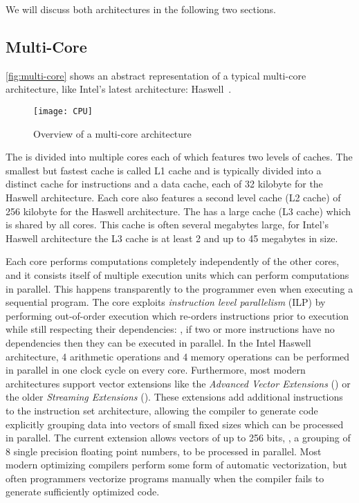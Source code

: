 We will discuss both architectures in the following two sections.

\subsection{Multi-Core \CPUs}
\autoref{fig:multi-core} shows an abstract representation of a typical multi-core \CPU architecture, like Intel's latest \CPU architecture: Haswell~\cite{IntelHaswell}.
\begin{figure}
  \centering
  \texttt{[image: CPU]}
  \caption{Overview of a multi-core \CPU architecture}
  \label{fig:multi-core}
\end{figure}
The \CPU is divided into multiple cores each of which features two levels of caches.
The smallest but fastest cache is called L1 cache and is typically divided into a distinct cache for instructions and a data cache, each of 32 kilobyte for the Haswell architecture.
Each core also features a second level cache (L2 cache) of 256 kilobyte for the Haswell architecture.
The \CPU has a large cache (L3 cache) which is shared by all cores.
This cache is often several megabytes large, for Intel's Haswell architecture the L3 cache is at least 2 and up to 45 megabytes in size.

Each \CPU core performs computations completely independently of the other cores, and it consists itself of multiple execution units which can perform computations in parallel.
This happens transparently to the programmer even when executing a sequential program.
The \CPU core exploits \emph{instruction level parallelism} (ILP) by performing out-of-order execution which re-orders instructions prior to execution while still respecting their dependencies:
\eg, if two or more instructions have no dependencies then they can be executed in parallel.
In the Intel Haswell architecture, 4 arithmetic operations and 4 memory operations can be performed in parallel in one clock cycle on every core.
Furthermore, most modern \CPU architectures support \SIMD vector extensions like the \emph{Advanced Vector Extensions} (\AVX) or the older \emph{Streaming \SIMD Extensions} (\SSE).
These extensions add additional instructions to the instruction set architecture, allowing the compiler to generate code explicitly grouping data into vectors of small fixed sizes which can be processed in parallel.
The current \AVX extension allows vectors of up to 256 bits, \eg, a grouping of 8 single precision floating point numbers, to be processed in parallel.
Most modern optimizing compilers perform some form of automatic vectorization, but often programmers vectorize programs manually when the compiler fails to generate sufficiently optimized code.

